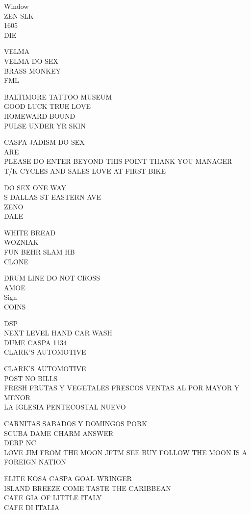 \documentclass[10pt,letterpaper]{article}
\begin{document}
Window\\
ZEN SLK\\
1605\\
DIE

VELMA\\
VELMA DO SEX\\
BRASS MONKEY\\
FML

BALTIMORE TATTOO MUSEUM\\
GOOD LUCK TRUE LOVE\\
HOMEWARD BOUND\\
PULSE UNDER YR SKIN

CASPA JADISM DO SEX\\
ARE\\
PLEASE DO ENTER BEYOND THIS POINT THANK YOU MANAGER\\
T/K CYCLES AND SALES LOVE AT FIRST BIKE

DO SEX ONE WAY\\
S DALLAS ST EASTERN AVE\\
ZENO\\
DALE

WHITE BREAD\\
WOZNIAK\\
FUN BEHR SLAM HB\\
CLONE

DRUM LINE DO NOT CROSS\\
AMOE\\
Sign\\
COINS

DSP\\
NEXT LEVEL HAND CAR WASH\\
DUME CASPA 1134\\
CLARK'S AUTOMOTIVE

CLARK'S AUTOMOTIVE\\
POST NO BILLS\\
FRESH FRUTAS Y VEGETALES FRESCOS VENTAS AL POR MAYOR Y MENOR\\
LA IGLESIA PENTECOSTAL NUEVO

CARNITAS SABADOS Y DOMINGOS PORK\\
SCUBA DAME CHARM ANSWER\\
DERP NC\\
LOVE JIM FROM THE MOON JFTM SEE BUY FOLLOW THE MOON IS A FOREIGN NATION

ELITE KOSA CASPA GOAL WRINGER\\
ISLAND BREEZE COME TASTE THE CARIBBEAN\\
CAFE GIA OF LITTLE ITALY\\
CAFE DI ITALIA
\end{document}
